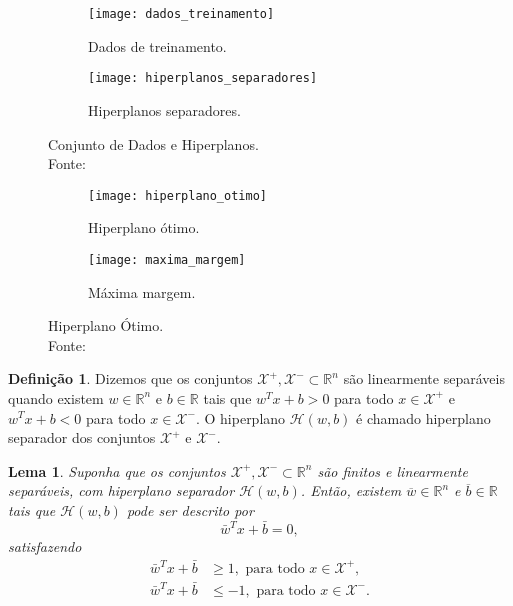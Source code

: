 \documentclass{beamer}
\def\Xset{\mathcal{X}}
\def\Hset{\mathcal{H}}
\def\RR{\mathds{R}}
\def\wbar{\bar{w}}
\def\bbar{\bar{b}}
\newtheorem{lema}{Lema}
\theoremstyle{definition}%
\newtheorem{defi}{Definição}
\begin{document}
\begin{frame}
\begin{figure}[h] 
	\centering
	\begin{subfigure}[h]{0.4\textwidth}
		\centering
		\texttt{[image: dados\_treinamento]}
		\caption{Dados de treinamento. \label{fig2:a}}
	\end{subfigure}
	\begin{subfigure}[h]{0.38\textwidth}
		\centering
		\texttt{[image: hiperplanos\_separadores]}
		\caption{Hiperplanos separadores. \label{fig2:b}}
	\end{subfigure}
	\caption{Conjunto de Dados e Hiperplanos. \label{fig2}
		\\ Fonte: \textcite{Evelin2017}}
\end{figure}
\begin{figure}[h] 
	\centering
	\begin{subfigure}[h]{0.4\textwidth}
		\centering
		\texttt{[image: hiperplano\_otimo]}
		\caption{Hiperplano ótimo. \label{fig3:a}}
	\end{subfigure}
	\begin{subfigure}[h]{0.4\textwidth}
		\centering
		\texttt{[image: maxima\_margem]}
		\caption{Máxima margem. \label{fig3:b}}	
	\end{subfigure}
	\caption{Hiperplano Ótimo. \label{fig3}
		\\ Fonte: \textcite{Evelin2017}}
\end{figure}
\end{frame}

\begin{frame}
\begin{defi} \label{def1} Dizemos que os conjuntos $\Xset^{+}, \Xset^{-} \subset \RR^n$ são linearmente separáveis quando existem $w\in \RR^n$ e $b\in \RR$  tais que $w^{T}x+b>0$ para todo $x\in \Xset^{+}$ e $w^{T}x+b<0$ para todo $x\in \Xset^{-}$. O hiperplano $\Hset(w,b)$ é chamado hiperplano separador dos conjuntos $\Xset^{+}$ e $\Xset^{-}$.
\end{defi}

\begin{lema} Suponha que os conjuntos $\Xset^{+}, \Xset^{-} \subset \RR^n$ são finitos e linearmente separáveis, com hiperplano separador $\Hset(w,b)$. Então, existem $\overline{w}\in \RR^n$ e $\overline{b}\in \RR$ tais que $\Hset(w,b)$ pode ser descrito por
	\[
	\wbar^{T}x+\bbar =0,
	\]
	satisfazendo
	\begin{align}
	\wbar^{T}x+\bbar &\geq 1, \text{ para todo } x\in \Xset^{+}, \label{eq1} \\
	\wbar^{T}x+\bbar &\leq -1, \text{ para todo } x\in \Xset^{-}. \label{eq2}
	\end{align}
\end{lema} 
\end{frame}
\end{document}
